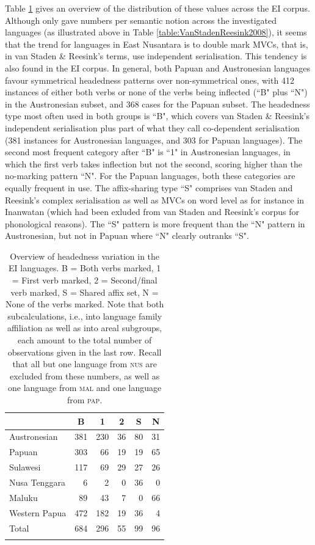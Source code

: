 Table \ref{table:Headedness_overview} gives an overview of the distribution of these values across the EI corpus. Although \citet{vanstaden2008serial} only gave numbers per semantic notion across the investigated languages (as illustrated above in Table \ref{table:VanStadenReesink2008}), it seems that the trend for languages in East Nusantara is to double mark MVCs, that is, in van Staden \& Reesink's terms, use independent serialisation. This tendency is also found in the EI corpus. In general, both Papuan and Austronesian languages favour symmetrical headedness patterns over non-symmetrical ones, with 412 instances of either both verbs or none of the verbs being inflected (``B" plus ``N") in the Austronesian subset, and 368 cases for the Papuan subset. The headedness type most often used in both groups is ``B", which covers van Staden \& Reesink's independent serialisation plus part of what they call co-dependent serialisation (381 instances for Austronesian languages, and 303 for Papuan languages). The second most frequent category after ``B" is ``1" in Austronesian languages, in which the first verb takes inflection but not the second, scoring higher than the no-marking pattern ``N". For the Papuan languages, both these categories are equally frequent in use. The affix-sharing type ``S" comprises van Staden and Reesink's complex serialisation as well as MVCs on word level as for instance in Inanwatan (which had been exluded from van Staden and Reesink's corpus for phonological reasons). The ``S" pattern is more frequent than the ``N" pattern in Austronesian, but not in Papuan where ``N" clearly outranks ``S".

\begin{table}
\begin{tabular}{lrrrrr}
  \lsptoprule
& \multicolumn{1}{c}{B} & \multicolumn{1}{c}{1} & \multicolumn{1}{c}{2} & \multicolumn{1}{c}{S} & \multicolumn{1}{c}{N} \tabularnewline 
  \midrule
  Austronesian & 381 & 230 &  36 &  80 & 31 \tabularnewline
  Papuan & 303 & 66 &  19 &  19 & 65 \tabularnewline
   \midrule
  Sulawesi & 117 &  69 &  29 &  27 &  26 \tabularnewline
  Nusa Tenggara & 6 & 2 &  0 &  36 & 0 \tabularnewline
  Maluku & 89 &  43 &   7 &   0 &   66 \tabularnewline 
  Western Papua & 472 & 182 &  19 &  36 &  4 \tabularnewline 
\midrule
Total & 684 & 296 & 55 & 99 & 96 \tabularnewline
\lspbottomrule
\end{tabular}
\caption[Headedness variation in the EI corpus]{Overview of headedness variation in the EI languages. B = Both verbs marked, 1 = First verb marked, 2 = Second/final verb marked, S = Shared affix set, N = None of the verbs marked. Note that both subcalculations, i.e., into language family affiliation as well as into areal subgroups, each amount to the total number of observations given in the last row. Recall that all but one language from \textsc{nus} are excluded from these numbers, as well as one language from \textsc{mal} and one language from \textsc{pap}.}
\label{table:Headedness_overview}
\end{table}

